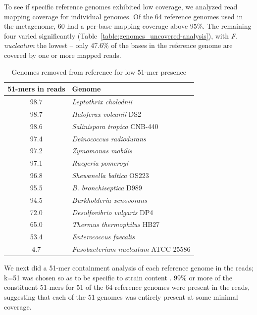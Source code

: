 \documentclass[11pt]{article}
\begin{document}
To see if specific reference genomes exhibited low coverage, we
analyzed read mapping coverage for individual genomes.  Of the 64
reference genomes used in the metagenome, 60 had a per-base mapping
coverage above 95\%.  The remaining four varied significantly
(Table~\ref{table:genomes_uncovered-analysis}), with {\em
  F. nucleatum} the lowest -- only 47.6\% of the bases in the
reference genome are covered by one or more mapped reads.

\begin{table}[t]
\caption{Genomes removed from reference for low 51-mer presence}
\centering
\begin{tabular}{|c|l|}
\hline

\textbf{51-mers in reads}& \textbf{Genome} \\ [0.5ex] %
\hline
98.7 & { \small \em Leptothrix cholodnii } \\ \hline
98.7 & { \small \em Haloferax volcanii} DS2  \\ \hline
98.6 & { \small \em Salinispora tropica} CNB-440 \\ \hline
97.4 & { \small \em Deinococcus radiodurans } \\ \hline
97.2 & { \small \em Zymomonas mobilis } \\ \hline
97.1 & { \small \em Ruegeria pomeroyi } \\ \hline
96.8 & { \small \em Shewanella baltica} OS223  \\ \hline
95.5 & { \small \em B. bronchiseptica} D989  \\ \hline
94.5 & { \small \em Burkholderia xenovorans } \\ \hline
72.0 & { \small \em Desulfovibrio vulgaris} DP4  \\ \hline
65.0 & { \small \em Thermus thermophilus} HB27  \\ \hline
53.4 & { \small \em Enterococcus faecalis } \\ \hline
4.7 & { \small \em Fusobacterium nucleatum} ATCC 25586  \\ \hline
\end{tabular}
\label{table:51mer_remove}
\end{table}


We next did a 51-mer containment analysis of each reference genome in
the reads; k=51 was chosen so as to be specific to strain content
\cite{metapalette}.  99\% or more of the constituent 51-mers for 51 of
the 64 reference genomes were present in the reads, suggesting that
each of the 51 genomes was entirely present at some minimal coverage.
\end{document}

